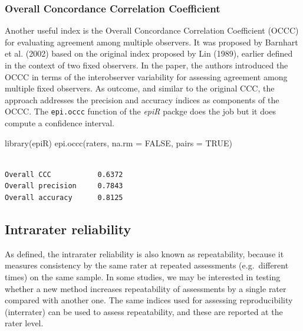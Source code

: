 \documentclass[
  letterpaper,
  DIV=11,
  numbers=noendperiod]{scrreprt}
\newenvironment{Shaded}{\begin{snugshade}}{\end{snugshade}}
\newcommand{\AttributeTok}[1]{\textcolor[rgb]{0.40,0.45,0.13}{#1}}
\newcommand{\ConstantTok}[1]{\textcolor[rgb]{0.56,0.35,0.01}{#1}}
\newcommand{\FunctionTok}[1]{\textcolor[rgb]{0.28,0.35,0.67}{#1}}
\newcommand{\NormalTok}[1]{\textcolor[rgb]{0.00,0.23,0.31}{#1}}
\begin{document}
\hypertarget{overall-concordance-correlation-coefficient}{%
\subsubsection{Overall Concordance Correlation
Coefficient}\label{overall-concordance-correlation-coefficient}}

Another useful index is the Overall Concordance Correlation Coefficient
(OCCC) for evaluating agreement among multiple observers. It was
proposed by Barnhart et al. (2002) based on the original index proposed
by Lin (1989), earlier defined in the context of two fixed observers. In
the paper, the authors introduced the OCCC in terms of the interobserver
variability for assessing agreement among multiple fixed observers. As
outcome, and similar to the original CCC, the approach addresses the
precision and accuracy indices as components of the OCCC. The
\texttt{epi.occc} function of the \emph{epiR} packge does the job but it
does compute a confidence interval.

\begin{Shaded}
\begin{Highlighting}[]
\FunctionTok{library}\NormalTok{(epiR)}
\FunctionTok{epi.occc}\NormalTok{(raters, }\AttributeTok{na.rm =} \ConstantTok{FALSE}\NormalTok{, }\AttributeTok{pairs =} \ConstantTok{TRUE}\NormalTok{)}
\end{Highlighting}
\end{Shaded}

\begin{verbatim}

Overall CCC           0.6372
Overall precision     0.7843
Overall accuracy      0.8125
\end{verbatim}

\hypertarget{intrarater-reliability}{%
\subsection{Intrarater reliability}\label{intrarater-reliability}}

As defined, the intrarater reliability is also known as repeatability,
because it measures consistency by the same rater at repeated
assessments (e.g.~different times) on the same sample. In some studies,
we may be interested in testing whether a new method increases
repeatability of assessments by a single rater compared with another
one. The same indices used for assessing reproducibility (interrater)
can be used to assess repeatability, and these are reported at the rater
level.
\end{document}
